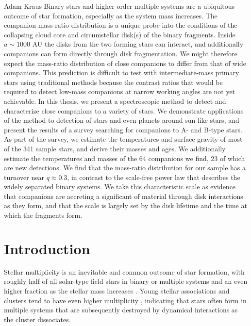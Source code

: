 \documentclass{utthesis}
\begin{document}
%
%

\begin{UTabstract}{Adam Kraus}
Binary stars and higher-order multiple systems are a ubiquitous outcome of star formation, especially as the system mass increases. The companion mass-ratio distribution is a unique probe into the conditions of the collapsing cloud core and circumstellar disk(s) of the binary fragments. Inside $a \sim 1000$ AU the disks from the two forming stars can interact, and additionally companions can form directly through disk fragmentation. We might therefore expect the mass-ratio distribution of close companions to differ from that of wide companions. This prediction is difficult to test with intermediate-mass primary stars using traditional methods because the contrast ratios that would be required to detect low-mass companions at narrow working angles are not yet achievable. In this thesis, we present a spectroscopic method to detect and characterize close companions to a variety of stars. We demonstrate applications of the method to detection of stars and even planets around sun-like stars, and present the results of a survey searching for companions to A- and B-type stars. As part of the survey, we estimate the temperatures and surface gravity of most of the 341 sample stars, and derive their masses and ages. We additionally estimate the temperatures and masses of the 64 companions we find, 23 of which are new detections. We find that the mass-ratio distribution for our sample has a turnover near $q \approx 0.3$, in contrast to the scale-free power law that describes the widely separated binary systems. We take this characteristic scale as evidence that companions are accreting a significant of material through disk interactions as they form, and that the scale is largely set by the disk lifetime and the time at which the fragments form.

\end{UTabstract}


\tableofcontents

\listoffigures


\mainmatter

\chapter{Introduction}

Stellar multiplicity is an inevitable and common outcome of star formation, with roughly half of all solar-type field stars in binary or multiple systems \citep{Raghavan2010} and an even higher fraction as the stellar mass increases \citep{Zinnecker2007}. Young stellar associations and clusters tend to have even higher multiplicity \citep{Duchene2013}, indicating that stars often form in multiple systems that are subsequently destroyed by dynamical interactions as the cluster dissociates. 
\end{document}
